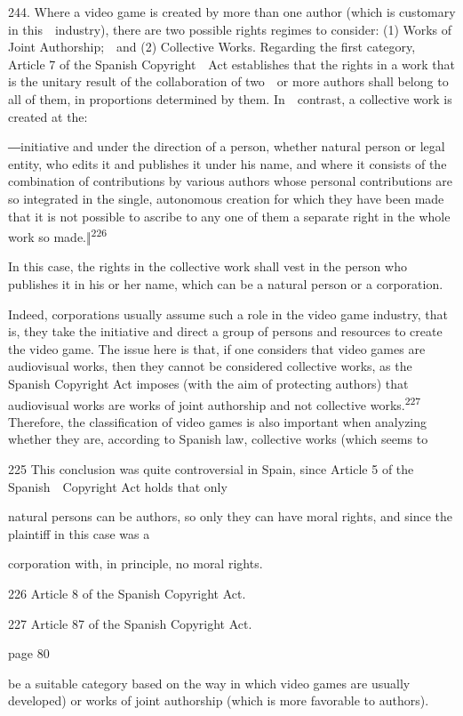 \documentclass[
]{article}
\begin{document}
{244. }{Where a video game is created by more than one author (which is
customary in this~~industry), there are two possible rights regimes to
consider: (1) Works of Joint Authorship;~~and (2) Collective Works.
Regarding the first category, Article 7 of the Spanish }{Copyright~~Act
}{establishes that the rights in a work that is the unitary result of
the collaboration of two~~or more authors shall belong to all of them,
in proportions determined by them. In~~contrast, a collective work is
created at the:}

{―}{initiative and under the direction of a person, whether natural
person or legal entity, who edits it and publishes it under his name,
and where it consists of the combination of contributions by various
authors whose personal contributions are so integrated in the single,
autonomous creation for which they have been made that it is not
possible to ascribe to any one of them a separate right in the whole
work so made.}{‖}\textsuperscript{{226}}

{In this case, the rights in the collective work shall vest in the
person who publishes it in his or her name, which can be a natural
person or a corporation.}

{Indeed, corporations usually assume such a role in the video game
industry, that is, they take the initiative and direct a group of
persons and resources to create the video game. The issue here is that,
if one considers that video games are }{audiovisual works}{, then they
cannot be considered collective works, as the Spanish }{Copyright Act
}{imposes (with the aim of protecting authors) that audiovisual works
are }{works of joint authorship }{and not collective
works.}\textsuperscript{{227 }}{Therefore, the classification of video
games is also important when analyzing whether they are, according to
Spanish law, collective works (which seems to}

{225 }{This conclusion was quite controversial in Spain, since Article 5
of the Spanish~~}{Copyright Act }{holds that only}

{natural persons can be authors, so only they can have moral rights, and
since the plaintiff in this case was a}

{corporation with, in principle, no moral rights.}

{226 }{Article 8 of the Spanish }{Copyright Act}{.}

{227 }{Article 87 of the Spanish }{Copyright Act}{.}

{page 80}

{be a suitable category based on the way in which video games are
usually developed) or works of joint authorship (which is more favorable
to authors).}
\end{document}
